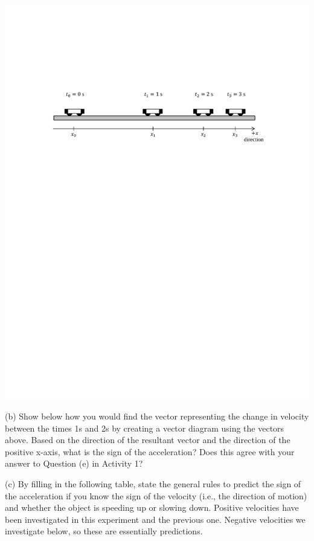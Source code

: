 \vspace{0.5cm}
{\par\centering \includegraphics{slowing/carts_slowing.pdf} \par}
\vspace{0.5cm}

(b) Show below how you would find the vector representing the change in velocity
between the times 1s and 2s by creating a vector diagram using the vectors 
 above. Based on the direction of the resultant vector and the direction of 
the positive x-axis, what is the sign of the acceleration? 
Does this agree with your answer to Question (e) in Activity 1?
\answerspace{25mm}

(c) By filling in the following table, state the general rules to predict the 
sign of the acceleration if you know the sign of the velocity (i.e., the 
direction of motion) and whether the object is speeding up or slowing down. 
Positive velocities have been investigated in this experiment and the previous 
one. Negative velocities we investigate below, so these are essentially 
predictions.

